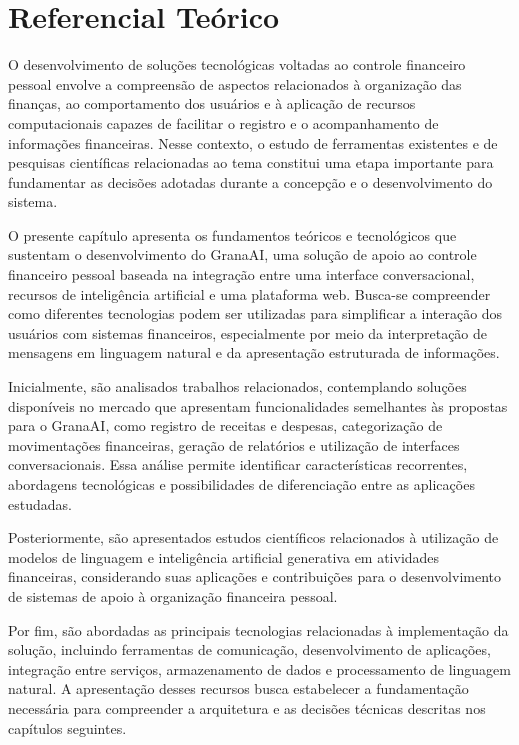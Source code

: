 \chapter{Referencial Teórico}
\label{cap:referencial}

O desenvolvimento de soluções tecnológicas voltadas ao controle financeiro pessoal envolve a compreensão de aspectos relacionados à organização das finanças, ao comportamento dos usuários e à aplicação de recursos computacionais capazes de facilitar o registro e o acompanhamento de informações financeiras. Nesse contexto, o estudo de ferramentas existentes e de pesquisas científicas relacionadas ao tema constitui uma etapa importante para fundamentar as decisões adotadas durante a concepção e o desenvolvimento do sistema.

O presente capítulo apresenta os fundamentos teóricos e tecnológicos que sustentam o desenvolvimento do GranaAI, uma solução de apoio ao controle financeiro pessoal baseada na integração entre uma interface conversacional, recursos de inteligência artificial e uma plataforma web. Busca-se compreender como diferentes tecnologias podem ser utilizadas para simplificar a interação dos usuários com sistemas financeiros, especialmente por meio da interpretação de mensagens em linguagem natural e da apresentação estruturada de informações.

Inicialmente, são analisados trabalhos relacionados, contemplando soluções disponíveis no mercado que apresentam funcionalidades semelhantes às propostas para o GranaAI, como registro de receitas e despesas, categorização de movimentações financeiras, geração de relatórios e utilização de interfaces conversacionais. Essa análise permite identificar características recorrentes, abordagens tecnológicas e possibilidades de diferenciação entre as aplicações estudadas.

Posteriormente, são apresentados estudos científicos relacionados à utilização de modelos de linguagem e inteligência artificial generativa em atividades financeiras, considerando suas aplicações e contribuições para o desenvolvimento de sistemas de apoio à organização financeira pessoal.

Por fim, são abordadas as principais tecnologias relacionadas à implementação da solução, incluindo ferramentas de comunicação, desenvolvimento de aplicações, integração entre serviços, armazenamento de dados e processamento de linguagem natural. A apresentação desses recursos busca estabelecer a fundamentação necessária para compreender a arquitetura e as decisões técnicas descritas nos capítulos seguintes.

